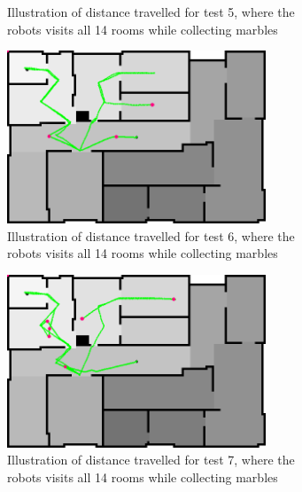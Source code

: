 \documentclass[../Head/Main.tex]{subfiles}
\begin{document}
\begin{figure}[H]
\begin{subfigure}[b]{0.49\textwidth}
    \caption{Illustration of distance travelled for test 5, where the robots visits all 14 rooms while collecting marbles}
    \label{fig:Marble5}
  \end{subfigure}
  \hfill
  \begin{subfigure}[b]{0.49\textwidth}
    \centering
    \includegraphics[width=0.85\textwidth]{../Figures/Modelbased/brushfireMarble6}
    \caption{Illustration of distance travelled for test 6, where the robots visits all 14 rooms while collecting marbles}
    \label{fig:Marble6}
  \end{subfigure}
  \hfill
  \begin{subfigure}[b]{0.49\textwidth}
  \centering
  \includegraphics[width=0.85\textwidth]{../Figures/Modelbased/brushfireMarble7}
    \caption{Illustration of distance travelled for test 7, where the robots visits all 14 rooms while collecting marbles}
    \label{fig:Marble7}
  \end{subfigure}
  \hfill
  \begin{subfigure}[b]{0.49\textwidth}
    \centering

\end{subfigure}
\end{figure}
\end{document}
